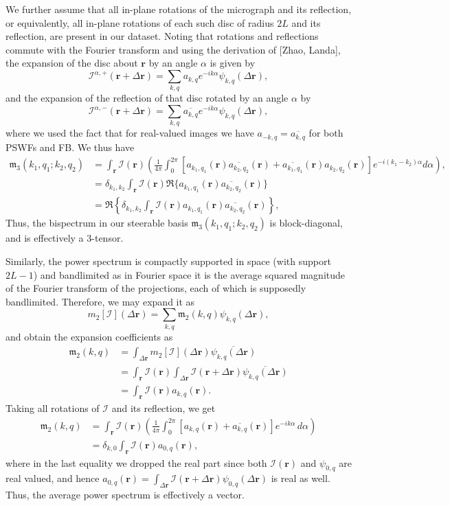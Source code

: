 \documentclass{amsart}
\theoremstyle{definition}
\theoremstyle{remark}
\numberwithin{equation}{section}
\newcommand{\rr}{\mathbf{r}}
\newcommand{\II}{\mathcal{I}}
\begin{document}
We further assume that all in-plane rotations of the micrograph and its reflection, or equivalently, all in-plane rotations of each such disc of radius $2L$ and its reflection, are present in our dataset. Noting that rotations and reflections commute with the Fourier transform and using the derivation of [Zhao, Landa], the expansion of the disc about $\rr$ by an angle $\alpha$ is given by
\[ \II^{\alpha,+}(\rr+\Delta\rr) = \sum_{k,q}a_{k,q}e^{-ik\alpha}\psi_{k,q}(\Delta\rr),\]
and the expansion of the reflection of that disc rotated by an angle $\alpha$ by
\[ \II^{\alpha,-}(\rr+\Delta\rr) = \sum_{k,q}\overline{a_{k,q}}e^{-ik\alpha}\psi_{k,q}(\Delta\rr),\]
where we used the fact that for real-valued images we have $a_{-k,q}=\overline{a_{k,q}}$ for both PSWFs and FB. We thus have
\[\begin{aligned} \mathfrak{m}_3(k_1,q_1;k_2,q_2) &= \int_{\rr}\II(\rr)\left(\frac{1}{4\pi}\int_0^{2\pi}\left[a_{k_1,q_1}(\rr)\overline{a_{k_2,q_2}}(\rr) + \overline{a_{k_1,q_1}}(\rr)a_{k_2,q_2}(\rr)\right]e^{-i(k_1-k_2)\alpha}d\alpha\right),\\
&= \delta_{k_1,k_2}\int_{\rr}\II(\rr)\Re\{a_{k_1,q_1}(\rr)\overline{a_{k_2,q_2}}(\rr)\}\\
&= \Re\left\{\delta_{k_1,k_2}\int_{\rr}\II(\rr)a_{k_1,q_1}(\rr)\overline{a_{k_2,q_2}}(\rr)\right\},\end{aligned}\]
Thus, the bispectrum in our steerable basis $\mathfrak{m}_3(k_1,q_1;k_2,q_2)$ is block-diagonal, and is effectively a 3-tensor. 

Similarly, the power spectrum is compactly supported in space (with
support $2L-1$) and bandlimited as in Fourier space it is the average
squared magnitude of the Fourier transform of the projections, each
of which is supposedly bandlimited. Therefore, we may expand it as
\[ m_2[\II](\Delta\rr) =
  \sum_{k,q}\mathfrak{m}_2(k,q)\psi_{k,q}(\Delta\rr),\]
and obtain the expansion coefficients as
\[\begin{aligned} 
\mathfrak{m}_2(k,q) &=
\int_{\Delta\rr}m_2[\II](\Delta\rr)\overline{\psi_{k,q}(\Delta\rr)}\\
&=
\int_{\rr}\II(\rr)\int_{\Delta\rr}\II(\rr+\Delta\rr)\overline{\psi_{k,q}(\Delta\rr)}\\
&= \int_{\rr}\II(\rr)a_{k,q}(\rr). \end{aligned}\]
Taking all rotations of $\II$ and its reflection, we get
\[\begin{aligned} 
\mathfrak{m}_2(k,q) &= \int_{\rr}\II(\rr)\left(\frac{1}{4\pi}\int_0^{2\pi}[a_{k,q}(\rr) +
    \overline{a_{k,q}}(\rr)]e^{-ik\alpha}\, d\alpha\right)\\ 
&= \delta_{k,0} \int_{\rr}\II(\rr)a_{0,q}(\rr), \end{aligned}\]
where in the last equality we dropped the real part since both
$\II(\rr)$ and $\psi_{0,q}$ are real valued, and hence $a_{0,q}(\rr)=\int_{\Delta\rr}\II(\rr+\Delta\rr)\psi_{0,q}(\Delta\rr)$
is real as well.
Thus, the average power spectrum is effectively a vector.
\end{document}
